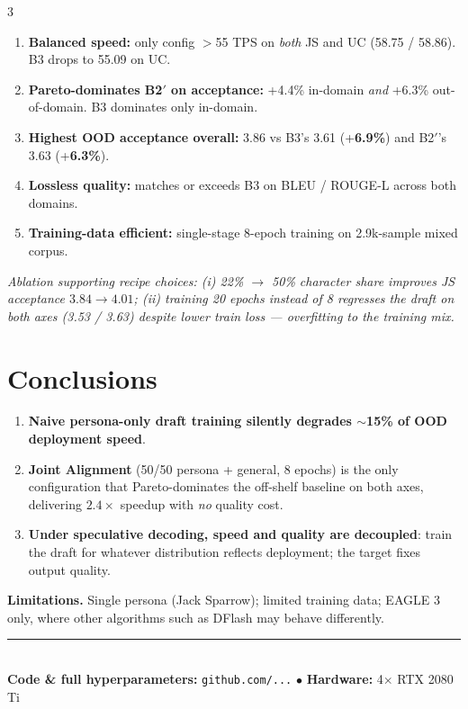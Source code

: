 \documentclass[9pt]{extarticle}
\begin{document}
\begin{multicols}{3}
\begin{takeawaybox}
\begin{enumerate}
  \item \textbf{Balanced speed:} only config $>$55 TPS on \emph{both} JS and UC (58.75 / 58.86). B3 drops to 55.09 on UC.
  \item \textbf{Pareto-dominates B2$'$ on acceptance:} +4.4\% in-domain \emph{and} +6.3\% out-of-domain. B3 dominates only in-domain.
  \item \textbf{Highest OOD acceptance overall:} 3.86 vs B3's 3.61 (+\textbf{6.9\%}) and B2$'$'s 3.63 (+\textbf{6.3\%}).
  \item \textbf{Lossless quality:} matches or exceeds B3 on BLEU / ROUGE-L across both domains.
  \item \textbf{Training-data efficient:} single-stage 8-epoch training on 2.9k-sample mixed corpus.
\end{enumerate}
\end{takeawaybox}

\footnotesize\emph{Ablation supporting recipe choices: (i) 22\% $\to$ 50\% character share improves JS acceptance $3.84 \to 4.01$; (ii) training 20 epochs instead of 8 regresses the draft on both axes (3.53 / 3.63) despite lower train loss --- overfitting to the training mix.}
\normalsize

\section{Conclusions}

\begin{enumerate}
  \item \textbf{Naive persona-only draft training silently degrades $\sim$15\% of OOD deployment speed}.
  \item \textbf{Joint Alignment} (50/50 persona + general, 8 epochs) is the only configuration that Pareto-dominates the off-shelf baseline on both axes, delivering $\mathbf{2.4\times}$ speedup with \emph{no} quality cost.
  \item \textbf{Under speculative decoding, speed and quality are decoupled}: train the draft for whatever distribution reflects deployment; the target fixes output quality.
\end{enumerate}

\textbf{Limitations.} Single persona (Jack Sparrow); limited training data; EAGLE 3 only, where other algorithms such as DFlash may behave differently.

\end{multicols}

\vspace{-0.7em}
\begin{center}
\scriptsize
\textcolor{primary}{\rule{0.9\linewidth}{0.4pt}}\\[0.05em]
\textbf{Code \& full hyperparameters:} \texttt{github.com/...} \quad$\bullet$\quad
\textbf{Hardware:} 4$\times$ RTX 2080 Ti
\end{center}
\end{document}

